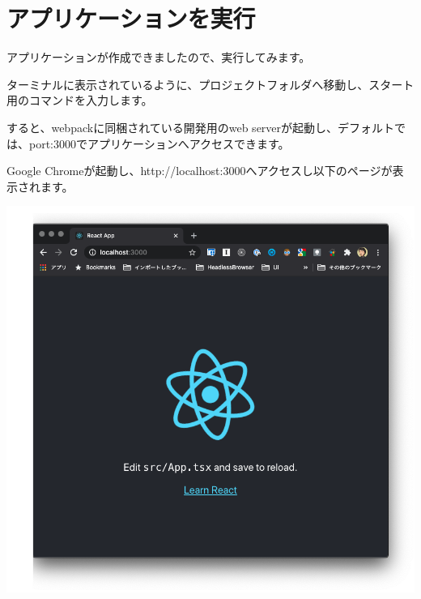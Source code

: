 \section{アプリケーションを実行}
\keeplastskip{
  \label{sec:2-2}
  \label{sec-02yarnstart}
  \par\nobreak
}

アプリケーションが作成できましたので、実行してみます。

ターミナルに表示されているように、プロジェクトフォルダへ移動し、スタート用のコマンドを入力します。

\def\startercodeblockfontsize{}
\begin{starterterminal}[]{}\end{starterterminal}

すると、webpackに同梱されている開発用のweb serverが起動し、デフォルトでは、port:3000でアプリケーションへアクセスできます。

\def\startercodeblockfontsize{}
\begin{starterterminal}[]{}\end{starterterminal}

Google Chromeが起動し、http://localhost:3000へアクセスし以下のページが表示されます。

\begin{reviewimage}[H]%
\includegraphics[width=1.0\maxwidth]{./images/02-create-react-app/02_cra_start.png}%
\label{image:02-create-react-app:02_cra_start}
\end{reviewimage}

